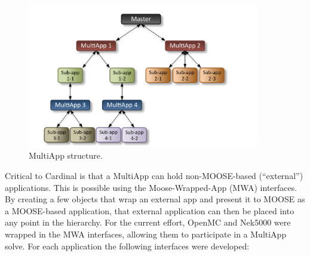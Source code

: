 \begin{figure}[!h]
\centering
\includegraphics[clip=true,width=0.9\textwidth]{Figures/moose1}
\caption{MultiApp structure.}
\label{f:moose1}
\end{figure}


Critical to Cardinal is that a MultiApp can hold non-MOOSE-based (``external'')
applications. This is possible using the Moose-Wrapped-App (MWA) interfaces. By
creating a few objects that wrap an external app and present it to MOOSE as a
MOOSE-based application, that external application can then be placed into any
point in the hierarchy. For the current effort, OpenMC and Nek5000 were wrapped
in the MWA interfaces, allowing them to participate in a MultiApp solve. For
each application the following interfaces were developed:


